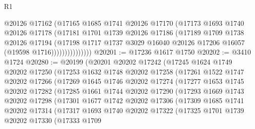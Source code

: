 \begin{lexlean}{R1}
\begin{coremodule}
                      @20126
                      @17162
                      (@17165
                        @1685
                        @1741
                        @20126
                        @17170
                        (@17173
                          @1693
                          @1740
                          @20126
                          @17178
                          (@17181
                            @1701
                            @1739
                            @20126
                            @17186
                            (@17189
                              @1709
                              @1738
                              @20126
                              @17194
                              (@17198
                                @1717
                                @1737
                                @3029
                                @16040
                                @20126
                                @17206
                                @16057
                                (@19598 @1716)))))))))))))))
@20201 := @17236 @1617 @1750
@20202 := @3410 @1724
@20280 := @20199
    (@20201
      @20202
      @17242
      (@17245
        @1624
        @1749
        @20202
        @17250
        (@17253
          @1632
          @1748
          @20202
          @17258
          (@17261
            @1522
            @1747
            @20202
            @17266
            (@17269
              @1645
              @1746
              @20202
              @17274
              (@17277
                @1653
                @1745
                @20202
                @17282
                (@17285
                  @1661
                  @1744
                  @20202
                  @17290
                  (@17293
                    @1669
                    @1743
                    @20202
                    @17298
                    (@17301
                      @1677
                      @1742
                      @20202
                      @17306
                      (@17309
                        @1685
                        @1741
                        @20202
                        @17314
                        (@17317
                          @1693
                          @1740
                          @20202
                          @17322
                          (@17325
                            @1701
                            @1739
                            @20202
                            @17330
                            (@17333
                              @1709

\end{coremodule}
\end{lexlean}
